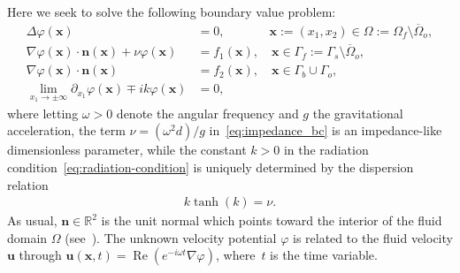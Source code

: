 \documentclass[review,hidelinks,onefignum,onetabnum]{siamart220329}
\newcommand{\R}{\mathbb{R}}
\newcommand{\bn}{\mathbf{n}}
\newcommand{\bx}{\mathbf{x}}
\begin{document}
Here we seek to solve the following boundary value problem:
%
\begin{subequations}
  \label{eq:water-waves-system}
  \begin{align}  
    \Delta \varphi(\bx) &=0,\phantom{(\bx)} \quad\ \bx:=(x_1,x_2) \in \Omega:=\Omega_f\setminus\overline\Omega_o,\\
    \nabla \varphi(\bx) \cdot \bn(\bx) + \nu \varphi(\bx)&=f_1(\bx), \quad \bx \in \Gamma_f:=\Gamma_s\setminus\overline\Omega_o,\label{eq:impedance_bc}\\
    \nabla \varphi(\bx) \cdot \bn(\bx) &=f_2(\bx), \quad \bx \in \Gamma_b \cup \Gamma_o,\\
    \label{eq:radiation-condition}  
    \lim_{x_1 \to \pm \infty} \partial_{x_1} \varphi(\bx) \mp i k \varphi(\bx)  &= 0,
  \end{align}
\end{subequations}
%
where letting $\omega>0$ denote the angular frequency and $g$ the
gravitational acceleration, the term $\nu = (\omega^2d)/g$ in~\eqref{eq:impedance_bc} is an impedance-like dimensionless parameter, while the constant $k > 0$ in the radiation condition~\cref{eq:radiation-condition} is uniquely determined by the dispersion relation
\begin{align}
\label{eq:dispersion-relation}
k\tanh(k) = \nu.
\end{align}
%
As usual, $\bn\in\R^2$ is the unit normal which points toward the interior of the
fluid domain $\Omega$ (see~).  The unknown velocity potential $\varphi$ is  related to
the fluid velocity $\boldsymbol{u}$ through $\boldsymbol{u}(\bx,t) = \operatorname{Re}
\left(e^{-i\omega t} \nabla \varphi \right)$, where~$t$ is the time variable.

\end{document}
